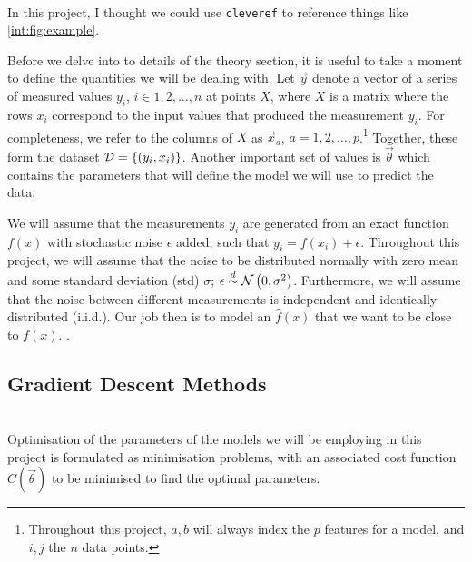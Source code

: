 \\
In this project, I thought we could use \verb|cleveref| to reference things like \cref{int:fig:example}.


Before we delve into to details of the theory section, it is useful to take a moment to define the quantities we will be dealing with. Let $\vec{y}$ denote a vector of a series of measured values $y_i$, $i\in 1, 2,\ldots, n$ at points $X$, where $X$ is a matrix where the rows $x_i$ correspond to the input values that produced the measurement $y_i$. For completeness, we refer to the columns of $X$ as $\vec{x}_a$, $a=1, 2,\ldots, p$.\footnote{Throughout this project, $a, b$ will always index the $p$ features for a model, and $i, j$ the $n$ data points.} Together, these form the dataset $\mathcal{D} = \left\{(y_i, x_i)\right\}$. Another important set of values is $\vec{\theta}$ which contains the parameters that will define the model we will use to predict the data.

We will assume that the measurements $y_i$ are generated from an exact function $f(x)$ with stochastic noise $\epsilon$ added, such that $y_i = f(x_i) + \epsilon$. Throughout this project, we will assume that the noise to be distributed normally with zero mean and some standard deviation (std) $\sigma$; $\epsilon \overset{d}{\sim} \operatorname{\mathcal{N}}\left(0,\sigma^2\right)$. Furthermore, we will assume that the noise between different measurements is independent and identically distributed (i.i.d.). Our job then is to model an $\hat{f}(x)$ that we want to be close to $f(x)$.
 \cite{Project1}.
\subsection{Gradient Descent Methods}
    \\
    Optimisation of the parameters of the models we will be employing in this project is formulated as minimisation problems, with an associated cost function $C(\vec{\theta})$ to be minimised to find the optimal parameters.
